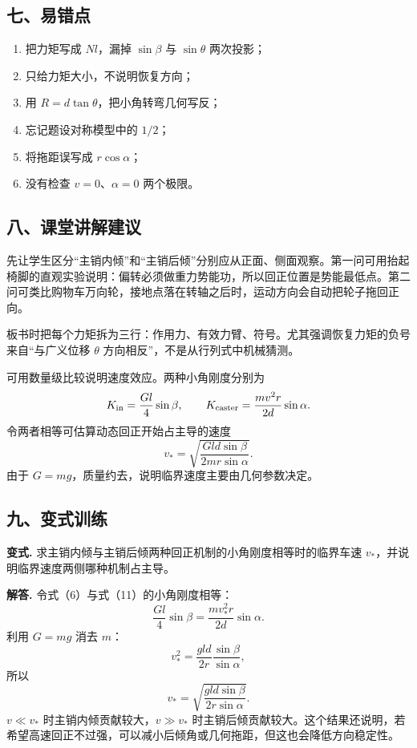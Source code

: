 \documentclass[12pt,a4paper,UTF8]{ctexart}
\newcommand{\tightlist}{\setlength{\itemsep}{0pt}\setlength{\parskip}{0pt}}
\begin{document}
\subsection{七、易错点}\label{ux4e03ux6613ux9519ux70b9}

\begin{enumerate}
\def\labelenumi{\arabic{enumi}.}
\tightlist
\item
  把力矩写成 \(Nl\)，漏掉 \(\sin\beta\) 与 \(\sin\theta\) 两次投影；
\item
  只给力矩大小，不说明恢复方向；
\item
  用 \(R=d\tan\theta\)，把小角转弯几何写反；
\item
  忘记题设对称模型中的 \(1/2\)；
\item
  将拖距误写成 \(r\cos\alpha\)；
\item
  没有检查 \(v=0\)、\(\alpha=0\) 两个极限。
\end{enumerate}

\subsection{八、课堂讲解建议}\label{ux516bux8bfeux5802ux8bb2ux89e3ux5efaux8bae}

先让学生区分``主销内倾''和``主销后倾''分别应从正面、侧面观察。第一问可用抬起椅脚的直观实验说明：偏转必须做重力势能功，所以回正位置是势能最低点。第二问可类比购物车万向轮，接地点落在转轴之后时，运动方向会自动把轮子拖回正向。

板书时把每个力矩拆为三行：作用力、有效力臂、符号。尤其强调恢复力矩的负号来自``与广义位移
\(\theta\) 方向相反''，不是从行列式中机械猜测。

可用数量级比较说明速度效应。两种小角刚度分别为 \[
K_{\rm in}=\frac{Gl}{4}\sin\beta,\qquad
K_{\rm caster}=\frac{mv^2r}{2d}\sin\alpha.
\] 令两者相等可估算动态回正开始占主导的速度 \[
v_*=\sqrt{\frac{Gld\sin\beta}{2mr\sin\alpha}}.
\] 由于 \(G=mg\)，质量约去，说明临界速度主要由几何参数决定。

\subsection{九、变式训练}\label{ux4e5dux53d8ux5f0fux8badux7ec3}

\textbf{变式.}
求主销内倾与主销后倾两种回正机制的小角刚度相等时的临界车速
\(v_*\)，并说明临界速度两侧哪种机制占主导。

\textbf{解答.} 令式（6）与式（11）的小角刚度相等： \[
\frac{Gl}{4}\sin\beta
=\frac{mv_*^2r}{2d}\sin\alpha.
\] 利用 \(G=mg\) 消去 \(m\)： \[
v_*^2
=\frac{gld}{2r}\frac{\sin\beta}{\sin\alpha},
\] 所以 \[
\boxed{
v_*=\sqrt{
\frac{gld\sin\beta}{2r\sin\alpha}
}
}.
\] \(v\ll v_*\) 时主销内倾贡献较大，\(v\gg v_*\)
时主销后倾贡献较大。这个结果还说明，若希望高速回正不过强，可以减小后倾角或几何拖距，但这也会降低方向稳定性。
\end{document}
